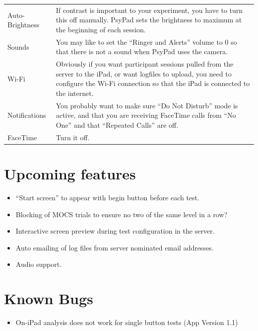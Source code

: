 \documentclass{article}
\begin{document}
\begin{tabular}{lp{10cm}}

Auto-Brightness & If contrast is important to your experiment, you have to turn this off manually.
PsyPad sets the brightness to maximum at the beginning of each session.\\

Sounds & You may like to set the ``Ringer and Alerts'' volume to 0 so that there is not a sound when
PsyPad uses the camera.\\

Wi-Fi & Obviously if you want participant sessions pulled from the server to the iPad, or want logfiles
to upload, you need to configure the Wi-Fi connection so that the iPad is connected to the internet.\\

Notifications & You probably want to make sure ``Do Not Disturb'' mode is active, and that you are
receiving FaceTime calls from ``No One'' and that ``Repeated Calls'' are off. \\

FaceTime & Turn it off. \\

\end{tabular}

\section{Upcoming features}

\begin{itemize}
\item ``Start screen'' to appear with begin button before each test.
\item Blocking of MOCS trials to ensure no two of the same level in a row?
\item Interactive screen preview during test configuration in the server.
\item Auto emailing of log files from server nominated email addresses.
\item Audio support.
\end{itemize}

\section{Known Bugs}

\begin{itemize}
\item On-iPad analysis does not work for single button tests (App Version 1.1)
\end{itemize}


 
\end{document}

